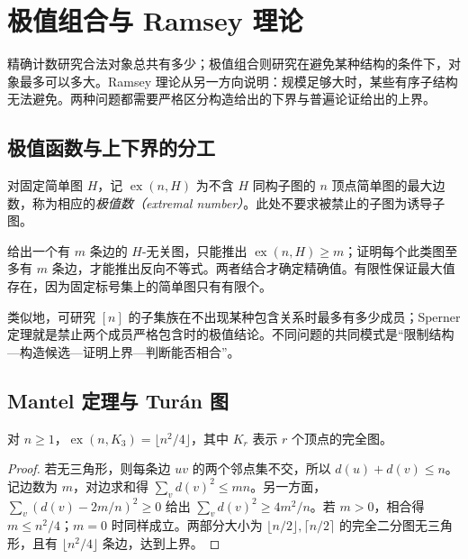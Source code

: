 \setcounter{chapter}{13} %
\chapter{极值组合与 Ramsey 理论}
\label{ch:extremal-ramsey}

精确计数研究合法对象总共有多少；极值组合则研究在避免某种结构的条件下，对象最多可以多大。Ramsey 理论从另一方向说明：规模足够大时，某些有序子结构无法避免。两种问题都需要严格区分构造给出的下界与普遍论证给出的上界。

\section{极值函数与上下界的分工}

\begin{definition}
对固定简单图 $H$，记 $\operatorname{ex}(n,H)$ 为不含 $H$ 同构子图的 $n$ 顶点简单图的最大边数，称为相应的\emph{极值数（extremal number）}。此处不要求被禁止的子图为诱导子图。
\end{definition}

给出一个有 $m$ 条边的 $H$-无关图，只能推出 $\operatorname{ex}(n,H)\ge m$；证明每个此类图至多有 $m$ 条边，才能推出反向不等式。两者结合才确定精确值。有限性保证最大值存在，因为固定标号集上的简单图只有有限个。

类似地，可研究 $[n]$ 的子集族在不出现某种包含关系时最多有多少成员；Sperner 定理就是禁止两个成员严格包含时的极值结论。不同问题的共同模式是“限制结构---构造候选---证明上界---判断能否相合”。

\section{Mantel 定理与 Tur\'an 图}

\begin{theorem}[Mantel 定理]
对 $n\ge1$，$\operatorname{ex}(n,K_3)=\lfloor n^2/4\rfloor$，其中 $K_r$ 表示 $r$ 个顶点的完全图。
\end{theorem}
\begin{proof}
若无三角形，则每条边 $uv$ 的两个邻点集不交，所以 $d(u)+d(v)\le n$。记边数为 $m$，对边求和得 $\sum_vd(v)^2\le mn$。另一方面，$\sum_v(d(v)-2m/n)^2\ge0$ 给出 $\sum_vd(v)^2\ge4m^2/n$。若 $m>0$，相合得 $m\le n^2/4$；$m=0$ 时同样成立。两部分大小为 $\lfloor n/2\rfloor,\lceil n/2\rceil$ 的完全二分图无三角形，且有 $\lfloor n^2/4\rfloor$ 条边，达到上界。
\end{proof}

